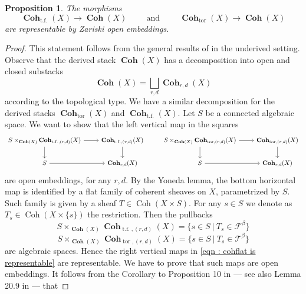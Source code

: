 \documentclass[11pt]{article}
\newtheorem{proposition}[theorem]{Proposition}
\newcommand{\fbeta}{\mathcal{F}^{\beta}}
\newcommand{\tbeta}{\mathcal{T}^{\beta}}
\newcommand{\fbetastack}{\boldsymbol{\operatorname{Coh}}_{\operatorname{t.f.}}(X)}
\newcommand{\tbetastack}{\boldsymbol{\operatorname{Coh}}_{\operatorname{tor}}(X)}
\newcommand{\coh}{\operatorname{Coh}}
\newcommand{\cohflat}{\boldsymbol{\operatorname{Coh}}}
\begin{document}
\begin{proposition}\label{prop : open tp}
    The morphisms
    \begin{equation}\label{eqn : embeddings of tbeta and fbeta}
        \fbetastack \rightarrow \cohflat(X) \hspace{1cm} \text{and} \hspace{1cm} \tbetastack\rightarrow\cohflat(X)
    \end{equation}
    are representable by Zariski open embeddings.
\end{proposition}
\begin{proof}
    This statement follows from the general results of \cite{Bayer_2021} in the underived setting. Observe that the derived stack $\cohflat(X)$ has a decomposition into open and closed substacks
\[
    \cohflat(X) = \bigsqcup_{r,d} \cohflat_{r,d}(X)
\]
according to the topological type. We have a similar decomposition for the derived stacks $\tbetastack$ and $\fbetastack$. Let $S$ be a connected algebraic space. We want to show that the left vertical map in the squares
    \begin{equation}\label{eqn : cohflat is representable}
\begin{tikzcd}
	{S\times_{\cohflat(X)} \cohflat_{\operatorname{t.f.}, (r,d)}(X)} & \cohflat_{\operatorname{t.f.}, (r,d)}(X) & {S \times_{\cohflat(X)} \cohflat_{\operatorname{tor}, (r,d)}(X)} & \cohflat_{\operatorname{tor}, (r,d)}(X) \\
	S & {\cohflat_{r,d}(X)} & S & {\cohflat_{r,d}(X)}
	\arrow[from=1-1, to=1-2]
	\arrow[from=1-1, to=2-1]
	\arrow[from=1-2, to=2-2]
	\arrow[from=1-3, to=1-4]
	\arrow[from=1-3, to=2-3]
	\arrow[from=1-4, to=2-4]
	\arrow[from=2-1, to=2-2]
	\arrow[from=2-3, to=2-4]
\end{tikzcd}
    \end{equation}
are open embeddings, for any $r,d$. By the Yoneda lemma, the bottom horizontal map is identified by a flat family of coherent sheaves on $X$, parametrized by $S$. Such family is given by a sheaf $T\in \coh(X \times S)$. For any $s\in S$ we denote as $T_s\in \coh(X\times \{s\})$ the restriction. Then the pullbacks
\begin{equation}\label{eqn : S'}
    S\times_{\cohflat(X)} \cohflat_{\operatorname{t.f.}, (r,d)}(X) = \{s\in S \ \Big| \ T_s \in \fbeta \}
\end{equation}
\[
    S\times_{\cohflat(X)}\cohflat_{\operatorname{tor}, (r,d)}(X) = \{s\in S \ \Big| \ T_s \in \tbeta \}
\]
are algebraic spaces. Hence the right vertical maps in \eqref{eqn : cohflat is representable} are representable. We have to prove that such maps are open embeddings. It follows from the Corollary to Proposition 10 in \cite{shatz} --- see also Lemma 20.9 in \cite{Bayer_2021} --- that 

\end{proof}
\end{document}
